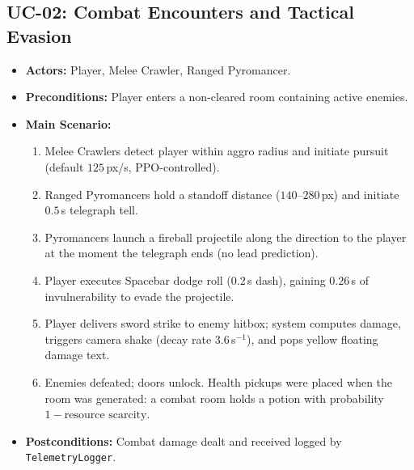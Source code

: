 \subsection{UC-02: Combat Encounters and Tactical Evasion}
\begin{itemize}
    \item \textbf{Actors:} Player, Melee Crawler, Ranged Pyromancer.
    \item \textbf{Preconditions:} Player enters a non-cleared room containing active enemies.
    \item \textbf{Main Scenario:}
    \begin{enumerate}
        \item Melee Crawlers detect player within aggro radius and initiate pursuit (default $125$\,px/s, PPO-controlled).
        \item Ranged Pyromancers hold a standoff distance ($140$--$280$\,px) and initiate $0.5$\,s telegraph tell.
        \item Pyromancers launch a fireball projectile along the direction to the player at the moment the telegraph ends (no lead prediction).
        \item Player executes Spacebar dodge roll ($0.2$\,s dash), gaining $0.26$\,s of invulnerability to evade the projectile.
        \item Player delivers sword strike to enemy hitbox; system computes damage, triggers camera shake (decay rate $3.6$\,s$^{-1}$), and pops yellow floating damage text.
        \item Enemies defeated; doors unlock. Health pickups were placed when the room was generated: a combat room holds a potion with probability $1 - \text{resource scarcity}$.
    \end{enumerate}
    \item \textbf{Postconditions:} Combat damage dealt and received logged by \texttt{TelemetryLogger}.
\end{itemize}

